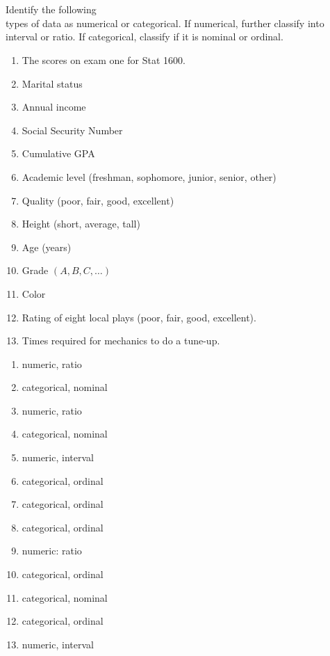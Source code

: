 \documentclass[11pt]{book}\usepackage[]{graphicx}\usepackage[]{color}
\begin{document}

\twocolumn

\section{}

 \begin{exercises}    %
  \begin{exercise}  %

Identify the following \\ types of  data as numerical or categorical.  If numerical, further classify into interval or ratio. If categorical, classify if it is nominal or ordinal.

	  \begin{enumerate}
	  \item The scores on exam one for Stat 1600.
    \item Marital status
    \item Annual income
    \item Social Security Number
    \item Cumulative GPA
    \item Academic level (freshman, sophomore, junior, senior, other)
    \item Quality (poor, fair, good, excellent)
    \item Height (short, average, tall)
    \item Age (years)
    \item Grade $(A, B, C, \dots)$
    \item Color
    \item Rating of eight local plays (poor, fair, good, excellent).
    \item Times required for mechanics to do a tune-up.
  	\end{enumerate}


  \end{exercise}
  \begin{solution}  %

    \begin{enumerate}
	  \item   numeric, ratio
    \item  categorical, nominal
    \item  numeric, ratio
    \item  categorical, nominal
    \item  numeric, interval
    \item  categorical, ordinal
    \item  categorical, ordinal
    \item  categorical, ordinal
    \item  numeric: ratio
    \item  categorical, ordinal
    \item  categorical, nominal
    \item  categorical, ordinal
    \item  numeric, interval
  	\end{enumerate}
  \end{solution}


\end{exercises}
\end{document}
